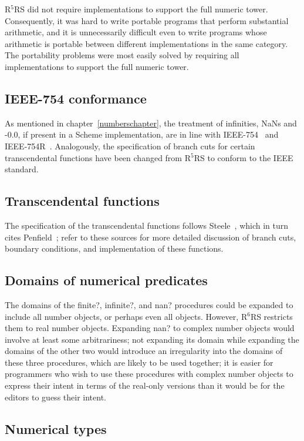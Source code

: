 \documentclass[twoside,twocolumn]{algol60}
\newcommand{\rn}[1]{R$^{#1}$RS}
\begin{document}
\rn{5} did not require implementations to support the full numeric
tower.  Consequently, it was hard to write portable programs that
perform substantial arithmetic, and it is unnecessarily difficult even
to write programs whose arithmetic is portable between different
implementations in the same category.  The portability problems were
most easily solved by requiring all implementations to support the
full numeric tower.

\subsection{IEEE-754 conformance}

As mentioned in chapter~\ref{numberschapter}, the treatment of
infinities, NaNs and -0.0, if present in a Scheme implementation, are
in line with IEEE-754~\cite{IEEE} and IEEE-754R~\cite{IEEE754R}.
Analogously, the specification of branch cuts for certain
transcendental functions have been changed from \rn{5} to conform to
the IEEE standard.

\subsection{Transcendental functions}

The specification of the transcendental functions follows
Steele~\cite{CLtL}, which in turn cites Penfield~\cite{Penfield81};
refer to these sources for more detailed discussion of branch cuts,
boundary conditions, and implementation of these functions.

\subsection{Domains of numerical predicates}

The domains of the {\cf finite?}, {\cf infinite?}, and {\cf nan?}
procedures could be expanded to include all number objects, or perhaps even
all objects.  However, \rn{6} restricts them to real number objects.
Expanding {\cf nan?} to complex number objects would involve at least some
arbitrariness; not expanding its domain while expanding the domains of
the other two would introduce an irregularity into the domains of
these three procedures, which are likely to be used together; it is
easier for programmers who wish to use these procedures with complex
number objects to express their intent in terms of the real-only versions
than it would be for the editors to guess their intent.

\subsection{Numerical types}
\end{document}
